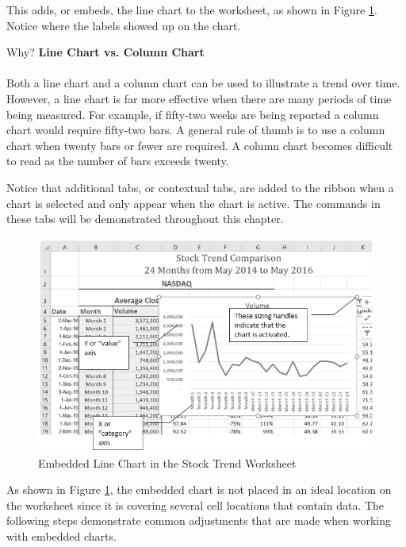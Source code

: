 This adds, or embeds, the line chart to the worksheet, as shown in Figure \ref{04:fig03}. Notice where the labels showed up on the chart.

\begin{center}
	\begin{infobox}{Why?}
		\textbf{Line Chart vs. Column Chart}
		\\
		\\
		Both a line chart and a column chart can be used to illustrate a trend over time. However, a line chart is far more effective when there are many periods of time being measured. For example, if fifty-two weeks are being reported a column chart would require fifty-two bars. A general rule of thumb is to use a column chart when twenty bars or fewer are required. A column chart becomes difficult to read as the number of bars exceeds twenty.
	\end{infobox}
\end{center}

Notice that additional tabs, or contextual tabs, are added to the ribbon when a chart is selected and only appear when the chart is active. The commands in these tabs will be demonstrated throughout this chapter.

\begin{figure}[H]
	\centering
	\includegraphics[width=\maxwidth{.95\linewidth}]{gfx/ch04_fig03}
	\caption{Embedded Line Chart in the Stock Trend Worksheet}
	\label{04:fig03}
\end{figure}

As shown in Figure \ref{04:fig03}, the embedded chart is not placed in an ideal location on the worksheet since it is covering several cell locations that contain data. The following steps demonstrate common adjustments that are made when working with embedded charts.


